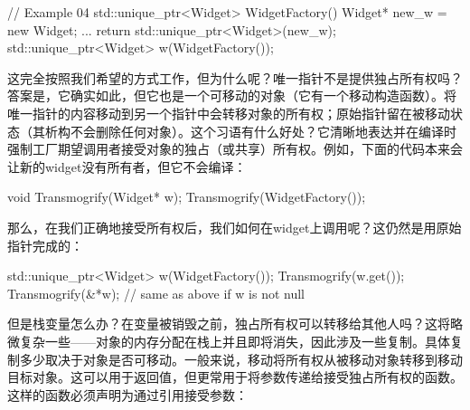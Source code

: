 \begin{code}
// Example 04
std::unique_ptr<Widget> WidgetFactory() {
  Widget* new_w = new Widget;
    ...
  return std::unique_ptr<Widget>(new_w);
}
std::unique_ptr<Widget> w(WidgetFactory());
\end{code}

这完全按照我们希望的方式工作，但为什么呢？唯一指针不是提供独占所有权吗？答案是，它确实如此，但它也是一个可移动的对象（它有一个移动构造函数）。将唯一指针的内容移动到另一个指针中会转移对象的所有权；原始指针留在被移动状态（其析构不会删除任何对象）。这个习语有什么好处？它清晰地表达并在编译时强制工厂期望调用者接受对象的独占（或共享）所有权。例如，下面的代码本来会让新的widget没有所有者，但它不会编译：

\begin{code}
void Transmogrify(Widget* w);
Transmogrify(WidgetFactory());
\end{code}

那么，在我们正确地接受所有权后，我们如何在widget上调用呢？这仍然是用原始指针完成的：

\begin{code}
std::unique_ptr<Widget> w(WidgetFactory());
Transmogrify(w.get());
Transmogrify(&*w);     // same as above if w is not null
\end{code}

但是栈变量怎么办？在变量被销毁之前，独占所有权可以转移给其他人吗？这将略微复杂一些——对象的内存分配在栈上并且即将消失，因此涉及一些复制。具体复制多少取决于对象是否可移动。一般来说，移动将所有权从被移动对象转移到移动目标对象。这可以用于返回值，但更常用于将参数传递给接受独占所有权的函数。这样的函数必须声明为通过引用接受参数：

